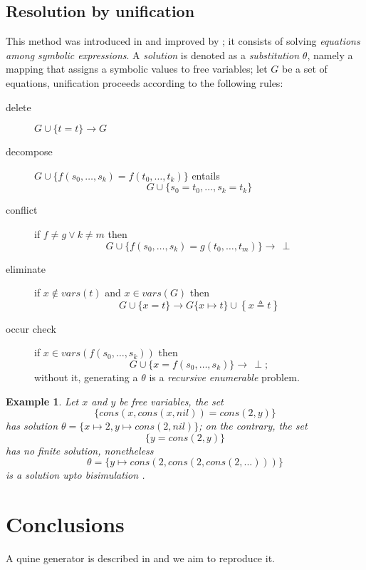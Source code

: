 \documentclass[a4paper,12pt]{article}
\newtheorem{example}[theorem]{Example}
\begin{document}
\subsection{Resolution by unification} 

This method was introduced in \citep{robinson_unif} and
improved by \citep{Martelli:1982:EUA:357162.357169}; it consists of solving
\textit{equations among symbolic expressions}. A \textit{solution} is denoted
as a \textit{substitution} $\theta$, namely a mapping that assigns a symbolic
values to free variables; let $G$ be a set of equations, unification proceeds
according to the following rules:
\begin{description}
\item[delete] $G \cup \lbrace t = t \rbrace \rightarrow G$
\item[decompose] $G \cup \lbrace f(s_{0}, \ldots, s_{k}) = f(t_{0}, \ldots, t_{k})\rbrace$ entails
$$G \cup \lbrace s_{0}=t_{0},\ldots, s_{k}=t_{k} \rbrace$$
\item[conflict] if $f\neq g \vee k\neq m$ then $$G \cup \lbrace f(s_{0}, \ldots, s_{k}) = g(t_{0}, \ldots, t_{m})\rbrace \rightarrow \,\perp$$
\item[eliminate] if $x \not\in vars(t)$ and $x \in vars(G)$ then $$G \cup \lbrace x = t\rbrace \rightarrow G\lbrace x \mapsto t\rbrace \cup \left\lbrace x \triangleq t\right\rbrace $$
\item[occur check] if $x \in vars(f(s_{0},\ldots,s_{k}))$ then $$G \cup \lbrace x = f(s_{0}, \ldots, s_{k})\rbrace \rightarrow \,\perp;$$
without it, generating a $\theta$ is a
\emph{recursive enumerable} problem.
\end{description}

\begin{example}
Let $x$ and $y$ be free variables, the set
$$\lbrace cons(x,cons(x,nil)) = cons(2,y)\rbrace$$
has solution $\theta = \lbrace x \mapsto 2, y \mapsto cons(2,nil) \rbrace$;
on the contrary, the set
$$ \lbrace y = cons(2,y) \rbrace $$
has no \textit{finite} solution, nonetheless
$$\theta = \lbrace y \mapsto cons(2,cons(2,cons(2,...))) \rbrace$$
is a solution upto \textit{bisimulation}
\citep{10.1007/BFb0017309, DBLP:books/daglib/0067019}.
\end{example}
\section{Conclusions}

A quine generator is described in \citep{Byrd:2012:MLU:2661103.2661105} and
we aim to reproduce it.



\end{document}
